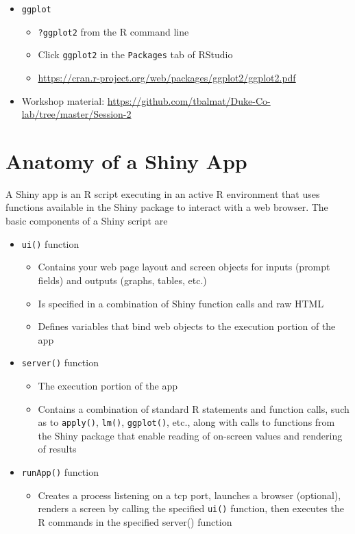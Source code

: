 \documentclass[10pt, letterpaper]{article}
\begin{document}
\begin{spacing}{1.0}
\begin{itemize}
  \item \texttt{ggplot}
    \begin{itemize}
        \item \texttt{?ggplot2} from the R command line
        \item Click \texttt{ggplot2} in the \texttt{Packages} tab of RStudio
        \item \url{https://cran.r-project.org/web/packages/ggplot2/ggplot2.pdf}
    \end{itemize}

  \item Workshop material:  \url{https://github.com/tbalmat/Duke-Co-lab/tree/master/Session-2}

\end{itemize}


\section{Anatomy of a Shiny App}\label{sec:anatomyofapp}

A Shiny app is an R script executing in an active R environment that uses functions available in the Shiny package to interact with a web browser.  The basic components of a Shiny script are

\begin{itemize}
    \item \texttt{ui()} function
    \begin{itemize}
        \item Contains your web page layout and screen objects for inputs (prompt fields) and outputs (graphs, tables, etc.)
        \item Is specified in a combination of Shiny function calls and raw HTML
        \item Defines variables that bind web objects to the execution portion of the app
    \end{itemize}
    \item \texttt{server()} function
    \begin{itemize}
        \item The execution portion of the app
        \item Contains a combination of standard R statements and function calls, such as to \texttt{apply()}, \texttt{lm()}, \texttt{ggplot()}, etc., along with calls to functions from the Shiny package that enable reading of on-screen values and rendering of results
    \end{itemize}
    \item \texttt{runApp()} function
    \begin{itemize}
        \item Creates a process listening on a tcp port, launches a browser (optional), renders a screen by calling the specified \texttt{ui()} function, then executes the R commands in the specified server() function
    \end{itemize}
\end{itemize}


\end{spacing}
\end{document}
